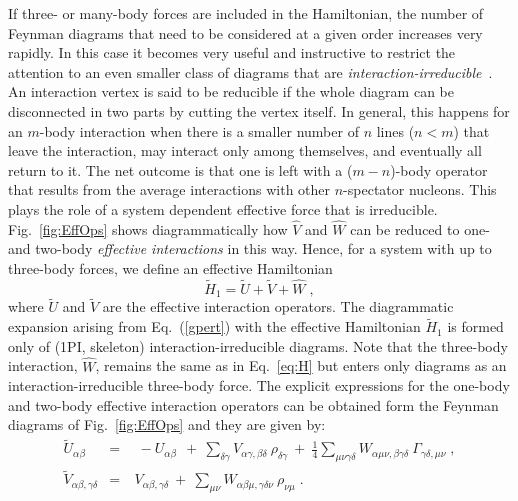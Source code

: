 If three- or many-body forces are included in the Hamiltonian, the number of Feynman diagrams that need to be considered at a given order increases very rapidly. In this case it becomes very useful and instructive to restrict the attention to an even smaller class of diagrams that are  {\em interaction-irreducible}~\cite{ch11_Carbone2013Nov}. An interaction vertex is said to be reducible if the whole diagram can be disconnected in two parts by cutting the vertex itself. In general, this happens for an $m$-body interaction when there is a smaller number of $n$ lines ($n < m$) that leave the interaction, may interact only among themselves, and eventually all return to it. The net outcome is that one is left with a ($m-n$)-body operator that results from the average interactions with other $n$-spectator nucleons. This plays the role of a system dependent effective force that is irreducible. Fig.~\ref{fig:EffOps} shows diagrammatically how  $\widehat{V}$ and $\widehat{W}$  can be reduced to  one- and two-body {\em effective interactions} in this way.
%
Hence, for a system with up to three-body forces, we define an effective Hamiltonian
\begin{equation}
\widetilde H_1= {\widetilde U} + {\widetilde  V} + \widehat W \; ,
\label{eq:Heff}
\end{equation}
where $\widetilde U$ and  $\widetilde V$ are the effective interaction operators. 
The diagrammatic expansion arising from  Eq.~(\ref{gpert}) with the effective Hamiltonian $\widetilde H_1$ is
formed only of (1PI, skeleton) interaction-irreducible diagrams. Note that the three-body interaction, $\widehat W$, remains the same as in Eq.~\eqref{eq:H} but enters only diagrams as an  interaction-irreducible three-body force.  
%
The explicit expressions for the one-body and two-body effective interaction operators can be obtained form the Feynman diagrams of Fig.~\ref{fig:EffOps} and they are given by:
\begin{subequations}
\label{eq:UV_eff}
\begin{eqnarray}
  \label{eq:U_eff}
  \widetilde{U}_{\alpha\beta}&=& ~ ~ -U_{\alpha \beta}  ~ ~ +  ~\sum_{\delta\gamma} V_{\alpha\gamma,\beta\delta}~\rho_{\delta\gamma}
                        ~ +  ~ \frac{1}{4} \sum_{\mu \nu \gamma \delta}W_{\alpha\mu\nu,\beta\gamma\delta}
                   ~\Gamma_{\gamma \delta, \mu \nu}  \; ,
  \\\label{eq:V_eff} 
  \widetilde{V}_{\alpha\beta,\gamma\delta} &=& ~ V_{\alpha\beta,\gamma\delta}  ~+ ~ 
                          \sum_{\mu\nu}W_{\alpha\beta \mu ,\gamma \delta \nu}~\rho_{\nu\mu}  \; .
\end{eqnarray}
\end{subequations}

